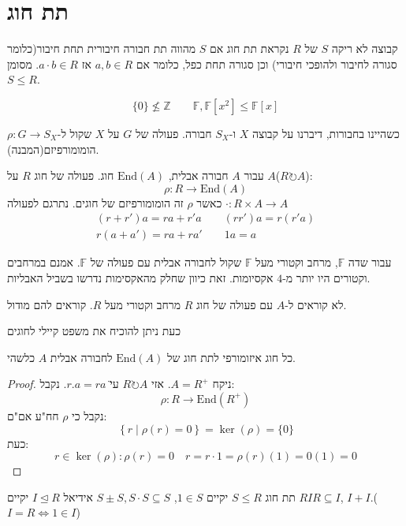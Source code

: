 \documentclass{tstextbook}
\begin{document}
\section{תת חוג}

\begin{definition}[תת חוג]
קבוצה לא ריקה \(S\) של \(R\) נקראת תת חוג אם \(S\) מהווה תת חבורה חיבורית תחת חיבור(כלומר סגורה לחיבור ולהופכי חיבורי) וכן סגורה תחת כפל, כלומר אם \(a,b\in R\) אז \(a\cdot b \in R\). מסומן \(S\leq R\).

\end{definition}
\begin{example}
$$\{ 0 \}\not\leq \mathbb{Z} \qquad \mathbb{F},\mathbb{F}[x^2]\leq \mathbb{F}[x]$$

\end{example}
\begin{reminder}
כשהיינו בחבורות, דיברנו על קבוצה \(X\) ו-\(S_{X}\) חבורה. פעולה של \(G\) על \(X\) שקול ל-\(\rho:G\to S_{X}\) הומומורפיזם(המבנה).

\end{reminder}
\begin{definition}
עבור \(A\) חבורה אבלית, \(\mathrm{End}(A)\) חוג. פעולה של חוג \(R\) על \(A\)(\(R \circlearrowright A\)): $$\rho:R\to \mathrm{End}(A)$$ כאשר \(\rho\) זה הומומורפיזם של חוגים. נתרגם לפעולה \(\cdot:R\times A\to A\)$$\begin{gathered}(r+r')a=ra+r'a\qquad (rr')a=r(r'a) \\r(a+a')=ra+ra'\qquad 1a=a
\end{gathered}$$

\end{definition}
עבור שדה \(\mathbb{F}\), מרחב וקטורי מעל \(\mathbb{F}\) שקול לחבורה אבלית עם פעולה של \(\mathbb{F}\). אמנם במרחבים וקטורים היו יותר מ-\(4\) אקסיומות. זאת כיוון שחלק מהאקסימות נדרשו בשביל האבליות.

\begin{remark}
לא קוראים ל-\(A\) עם פעולה של חוג \(R\) מרחב וקטורי מעל \(R\). קוראים להם מודול.

\end{remark}
כעת ניתן להוכיח את משפט קיילי לחוגים

\begin{reminder}
כל חוג איזומורפי לתת חוג של \(\mathrm{End}(A)\) לחבורה אבלית \(A\) כלשהי.

\end{reminder}
\begin{proof}
ניקח \(A=R^+\). אזי \(R\circlearrowright A\) ע\"י \(r.a=ra\). נקבל:
$$\rho:R\to \mathrm{End}(R^+)$$
נקבל כי \(\rho\) חח"ע אם"ם:
$$\left\{  r \mid \rho(r)=0  \right\}=\ker\left( \rho \right)=\{ 0 \}$$
כעת:
$$r\in \ker\left( \rho \right):\rho(r)=0\quad r=r\cdot 1=\rho(r)(1)=0(1)=0$$

\end{proof}
תת חוג \(S\leq R\) יקיים \(1\in S\), \(S\pm S, S\cdot S\subseteq S\) אידיאל \(I\trianglelefteq R\) יקיים \(RIR\subseteq I\), \(I+I\).(\(I=R\iff 1\in I\))
\end{document}
